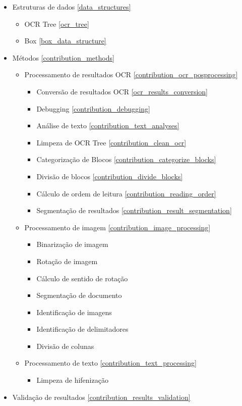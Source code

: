 \begin{itemize}\setlength\itemsep{-0.3em}
	\item Estruturas de dados \ref{data_structures}
	\begin{itemize}\setlength\itemsep{-0.3em}
		\item OCR Tree \ref{ocr_tree}
		\item Box \ref{box_data_structure}
	\end{itemize}
	\item Métodos \ref{contribution_methods}
	
	\begin{itemize}\setlength\itemsep{-0.3em}
		\item Processamento de resultados OCR \ref{contribution_ocr_posprocessing}
		
		\begin{itemize}\setlength\itemsep{-0.3em}
			\item Conversão de resultados OCR \ref{ocr_results_conversion}
			\item Debugging \ref{contribution_debugging}
			\item Análise de texto \ref{contribution_text_analyses}
			\item Limpeza de OCR Tree \ref{contribution_clean_ocr}
			\item Categorização de Blocos \ref{contribution_categorize_blocks}
			\item Divisão de blocos \ref{contribution_divide_blocks}
			\item Cálculo de ordem de leitura \ref{contribution_reading_order}
			\item Segmentação de resultados \ref{contribution_result_segmentation}
		\end{itemize}
		
		\item Processamento de imagem \ref{contribution_image_processing}
		\begin{itemize}\setlength\itemsep{-0.3em}
			\item Binarização de imagem
			\item Rotação de imagem
			\item Cálculo de sentido de rotação
			\item Segmentação de documento
			\item Identificação de imagens
			\item Identificação de delimitadores
			\item Divisão de colunas 
		\end{itemize}
		
		\item Processamento de texto \ref{contribution_text_processing}
		\begin{itemize}\setlength\itemsep{-0.3em}
			\item Limpeza de hifenização
		\end{itemize}
		
	\end{itemize}
	
	\item Validação de resultados \ref{contribution_results_validation}
	
\end{itemize}


